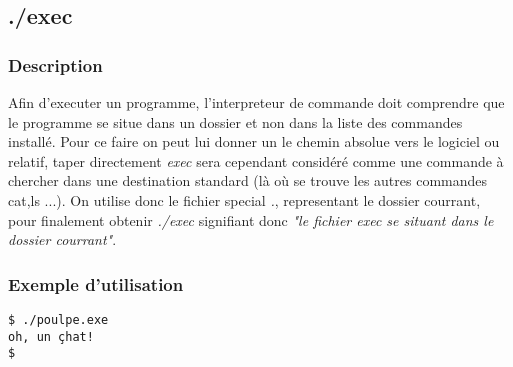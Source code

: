 \subsection*{./exec}
\subsubsection*{Description}
Afin d'executer un programme, l'interpreteur de commande doit comprendre que le programme se situe dans un dossier et non dans la liste des commandes installé.
Pour ce faire on peut lui donner un le chemin absolue vers le logiciel ou relatif, taper directement \emph{exec} sera cependant considéré comme une commande à chercher dans une destination standard (là où se trouve les autres commandes cat,ls ...).
On utilise donc le fichier special \emph{.}, representant le dossier courrant, pour finalement obtenir \emph{./exec} signifiant donc \emph{"le fichier exec se situant dans le dossier courrant"}.

\subsubsection*{Exemple d'utilisation}
\begin{lstlisting}
$ ./poulpe.exe
oh, un çhat!
$ 
\end{lstlisting}
